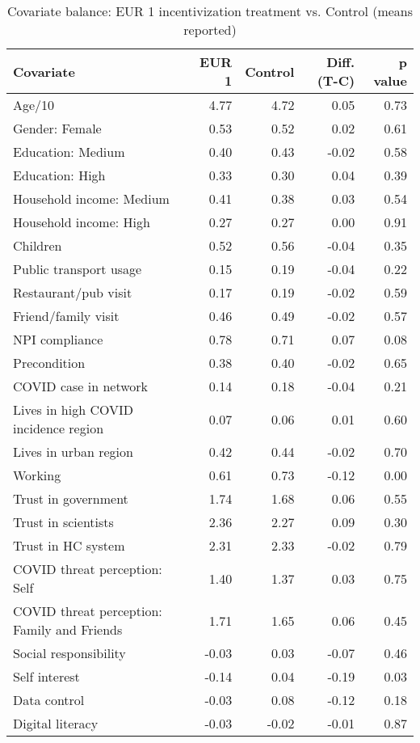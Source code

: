 \begin{table}[h!]
\centering
\caption{Covariate balance: EUR 1 incentivization treatment vs. Control (means reported)} 
\label{tab:eur1-balance}
\begingroup\footnotesize
\begin{tabular}{lrrrr}
  \hline
Covariate & EUR 1 & Control & Diff. (T-C) & p value \\ 
  \hline
Age/10 & 4.77 & 4.72 & 0.05 & 0.73 \\ 
  Gender: Female & 0.53 & 0.52 & 0.02 & 0.61 \\ 
  Education: Medium & 0.40 & 0.43 & -0.02 & 0.58 \\ 
  Education: High & 0.33 & 0.30 & 0.04 & 0.39 \\ 
  Household income: Medium & 0.41 & 0.38 & 0.03 & 0.54 \\ 
  Household income: High & 0.27 & 0.27 & 0.00 & 0.91 \\ 
  Children & 0.52 & 0.56 & -0.04 & 0.35 \\ 
  Public transport usage & 0.15 & 0.19 & -0.04 & 0.22 \\ 
  Restaurant/pub visit & 0.17 & 0.19 & -0.02 & 0.59 \\ 
  Friend/family visit & 0.46 & 0.49 & -0.02 & 0.57 \\ 
  NPI compliance & 0.78 & 0.71 & 0.07 & 0.08 \\ 
  Precondition & 0.38 & 0.40 & -0.02 & 0.65 \\ 
  COVID case in network & 0.14 & 0.18 & -0.04 & 0.21 \\ 
  Lives in high COVID incidence region & 0.07 & 0.06 & 0.01 & 0.60 \\ 
  Lives in urban region & 0.42 & 0.44 & -0.02 & 0.70 \\ 
  Working & 0.61 & 0.73 & -0.12 & 0.00 \\ 
  Trust in government & 1.74 & 1.68 & 0.06 & 0.55 \\ 
  Trust in scientists & 2.36 & 2.27 & 0.09 & 0.30 \\ 
  Trust in HC system & 2.31 & 2.33 & -0.02 & 0.79 \\ 
  COVID threat perception: Self & 1.40 & 1.37 & 0.03 & 0.75 \\ 
  COVID threat perception: Family and Friends & 1.71 & 1.65 & 0.06 & 0.45 \\ 
  Social responsibility & -0.03 & 0.03 & -0.07 & 0.46 \\ 
  Self interest & -0.14 & 0.04 & -0.19 & 0.03 \\ 
  Data control & -0.03 & 0.08 & -0.12 & 0.18 \\ 
  Digital literacy & -0.03 & -0.02 & -0.01 & 0.87 \\ 
   \hline
\end{tabular}
\endgroup
\end{table}
